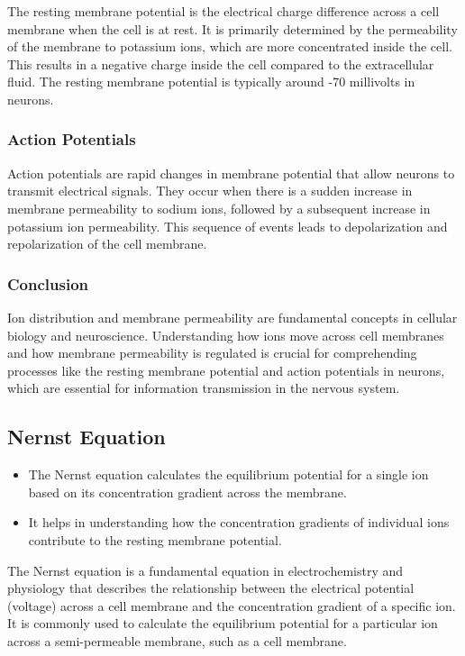 \documentclass{article}
\begin{document}
The resting membrane potential is the electrical charge difference across a cell membrane when the cell is at rest. It is primarily determined by the permeability of the membrane to potassium ions, which are more concentrated inside the cell. This results in a negative charge inside the cell compared to the extracellular fluid. The resting membrane potential is typically around -70 millivolts in neurons.

\subsubsection{Action Potentials}

Action potentials are rapid changes in membrane potential that allow neurons to transmit electrical signals. They occur when there is a sudden increase in membrane permeability to sodium ions, followed by a subsequent increase in potassium ion permeability. This sequence of events leads to depolarization and repolarization of the cell membrane.

\subsubsection{Conclusion}

Ion distribution and membrane permeability are fundamental concepts in cellular biology and neuroscience. Understanding how ions move across cell membranes and how membrane permeability is regulated is crucial for comprehending processes like the resting membrane potential and action potentials in neurons, which are essential for information transmission in the nervous system.



\subsection{Nernst Equation}
\begin{itemize}
    \item The Nernst equation calculates the equilibrium potential for a single ion based on its concentration gradient across the membrane.
    \item It helps in understanding how the concentration gradients of individual ions contribute to the resting membrane potential.
\end{itemize}
The Nernst equation is a fundamental equation in electrochemistry and physiology that describes the relationship between the electrical potential (voltage) across a cell membrane and the concentration gradient of a specific ion. It is commonly used to calculate the equilibrium potential for a particular ion across a semi-permeable membrane, such as a cell membrane.
\end{document}
